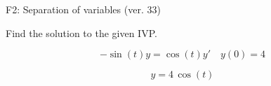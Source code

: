 \begin{exercise}
  \begin{exerciseTitle}F2: Separation of variables (ver. 33)\end{exerciseTitle}
  \begin{exerciseStatement}
    
Find the solution to the given IVP.

    
\[-\sin\left(t\right) y= \cos\left(t\right) y'\hspace{1em} y\left( 0 \right)= 4\]

  \end{exerciseStatement}
  \begin{exerciseAnswer}
    
\[y= 4 \, \cos\left(t\right)\]

  \end{exerciseAnswer}
\end{exercise}